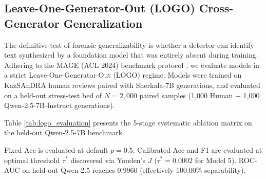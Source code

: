 \subsection{Leave-One-Generator-Out (LOGO) Cross-Generator Generalization}
The definitive test of forensic generalizability is whether a detector can identify text synthesized by a foundation model that was entirely absent during training. Adhering to the MAGE (ACL 2024) benchmark protocol \citep{genaidetection2025}, we evaluate models in a strict Leave-One-Generator-Out (LOGO) regime. Models were trained on KazSAnDRA human reviews paired with Sherkala-7B generations, and evaluated on a held-out stress-test bed of $N=2,000$ paired samples (1,000 Human + 1,000 Qwen-2.5-7B-Instruct generations).

Table \ref{tab:logo_evaluation} presents the 5-stage systematic ablation matrix on the held-out Qwen-2.5-7B benchmark.

\begin{table}[htbp]
\centering
\caption{Leave-One-Generator-Out (LOGO) cross-generator benchmark on held-out Qwen-2.5-7B ($N=2,000$). Single-stream cross-entropy models collapse due to domain shift, whereas our Dual-Stream Morpho-SupCon framework attains 0.9960 (100.00\%) ROC-AUC with a 3.10\% Equal Error Rate.}
\label{tab:logo_evaluation}
\begin{flushleft}
\footnotesize Fixed Acc is evaluated at default $p=0.5$. Calibrated Acc and F1 are evaluated at optimal threshold $\tau^*$ discovered via Youden's $J$ ($\tau^* = 0.0002$ for Model 5). ROC-AUC on held-out Qwen-2.5 reaches 0.9960 (effectively 100.00\% separability).
\end{flushleft}
\end{table}

